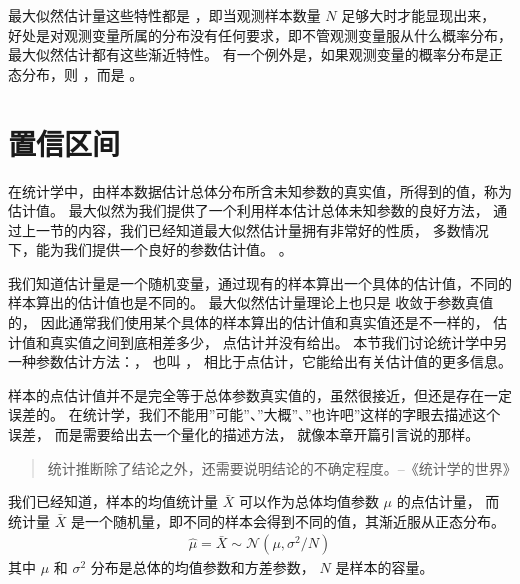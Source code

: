 \documentclass[letterpaper,10pt,english]{sphinxmanual}
\begin{document}
最大似然估计量这些特性都是 ，即当观测样本数量 \(N\) 足够大时才能显现出来，
好处是对观测变量所属的分布没有任何要求，即不管观测变量服从什么概率分布，最大似然估计都有这些渐近特性。
有一个例外是，如果观测变量的概率分布是正态分布，则 ，而是 。


\section{置信区间}
\label{\detokenize{_u63a8_u65ad_u4e0e_u68c0_u9a8c/content:id16}}
在统计学中，由样本数据估计总体分布所含未知参数的真实值，所得到的值，称为估计值。
最大似然为我们提供了一个利用样本估计总体未知参数的良好方法，
通过上一节的内容，我们已经知道最大似然估计量拥有非常好的性质，
多数情况下，能为我们提供一个良好的参数估计值。
。

我们知道估计量是一个随机变量，通过现有的样本算出一个具体的估计值，不同的样本算出的估计值也是不同的。
最大似然估计量理论上也只是  收敛于参数真值的，
因此通常我们使用某个具体的样本算出的估计值和真实值还是不一样的，
估计值和真实值之间到底相差多少，
点估计并没有给出。
本节我们讨论统计学中另一种参数估计方法：，
也叫 ，
相比于点估计，它能给出有关估计值的更多信息。

样本的点估计值并不是完全等于总体参数真实值的，虽然很接近，但还是存在一定误差的。
在统计学，我们不能用”可能”、”大概”、”也许吧”这样的字眼去描述这个误差，
而是需要给出去一个量化的描述方法，
就像本章开篇引言说的那样。
\begin{quote}

\begin{DUlineblock}{0em}
\item[] 统计推断除了结论之外，还需要说明结论的不确定程度。–《统计学的世界》
\end{DUlineblock}
\end{quote}

我们已经知道，样本的均值统计量 \(\bar{X}\) 可以作为总体均值参数 \(\mu\) 的点估计量，
而统计量 \(\bar{X}\) 是一个随机量，即不同的样本会得到不同的值，其渐近服从正态分布。
\begin{equation}\label{equation:推断与检验/content:eq_estimator_eval_085}
\begin{split}\hat{\mu} = \bar{X} \sim \mathcal{N}(\mu,\sigma^2/N)\end{split}
\end{equation}
其中 \(\mu\) 和 \(\sigma^2\) 分布是总体的均值参数和方差参数，
\(N\) 是样本的容量。
\end{document}
